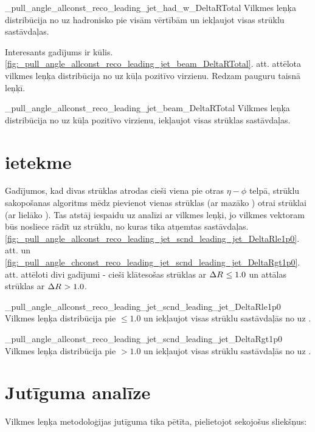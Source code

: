           {_pull_angle_allconst_reco_leading_jet_had_w_DeltaRTotal}
          {Vilkmes leņķa distribūcija no \leadingjet uz hadronisko \PW pie visām \DeltaR vērtībām un iekļaujot visas strūklu sastāvdaļas.}

Interesants gadījums ir kūlis. \ref{fig:_pull_angle_allconst_reco_leading_jet_beam_DeltaRTotal}. att. attēlota vilkmes leņķa distribūcija no \leadingjet uz kūļa pozitīvo virzienu. Redzam pauguru taisnā leņķī.

          {_pull_angle_allconst_reco_leading_jet_beam_DeltaRTotal}
          {Vilkmes leņķa distribūcija no \leadingjet uz kūļa pozitīvo virzienu, iekļaujot visas strūklas sastāvdaļas.}

\section{\DeltaR ietekme}

Gadījumos, kad divas strūklas atrodas cieši viena pie otras $\eta-\phi$ telpā, strūklu sakopošanas algoritms mēdz pievienot vienas strūklas (ar mazāko \pt) otrai strūklai (ar lielāko \pt). Tas atstāj iespaidu uz analīzi ar vilkmes leņķi, jo vilkmes vektoram būs nosliece rādīt uz strūklu, no kuras tika atņemtas sastāvdaļas. \ref{fig:_pull_angle_allconst_reco_leading_jet_scnd_leading_jet_DeltaRle1p0}. att. un \ref{fig:_pull_angle_chconst_reco_leading_jet_scnd_leading_jet_DeltaRgt1p0}. att. attēloti divi gadījumi - cieši klātesošas strūklas ar $\Delta R^{}\leq1.0$ un attālas strūklas ar $\Delta R^{}>1.0$.

          {_pull_angle_allconst_reco_leading_jet_scnd_leading_jet_DeltaRle1p0}
          {Vilkmes leņķa distribūcija pie \DeltaR$\leq1.0$ un iekļaujot visas strūklu sastāvdaļās no \leadingjet uz \scndleadingjet.}

          {_pull_angle_allconst_reco_leading_jet_scnd_leading_jet_DeltaRgt1p0}
          {Vilkmes leņķa distribūcija pie \DeltaR$>1.0$ un iekļaujot visas strūklu sastāvdaļās no \leadingjet uz \scndleadingjet.}


\section{Jutīguma analīze}

Vilkmes leņķa metodoloģijas jutīguma tika pētīta, pielietojot sekojošus \gls{sliekšņus}:

